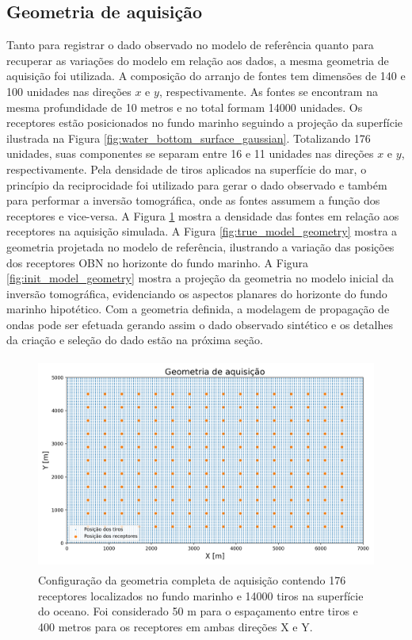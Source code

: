\subsection{Geometria de aquisição}

Tanto para registrar o dado observado no modelo de referência quanto para recuperar as variações do modelo em relação aos dados, a mesma geometria de aquisição foi utilizada. A composição do arranjo de fontes tem dimensões de 140 e 100 unidades nas direções $x$ e $y$, respectivamente. As fontes se encontram na mesma profundidade de 10 metros e no total formam 14000 unidades. Os receptores estão posicionados no fundo marinho seguindo a projeção da superfície ilustrada na Figura \ref{fig:water_bottom_surface_gaussian}. Totalizando 176 unidades, suas componentes se separam entre 16 e 11 unidades nas direções $x$ e $y$, respectivamente. Pela densidade de tiros aplicados na superfície do mar, o princípio da reciprocidade foi utilizado para gerar o dado observado e também para performar a inversão tomográfica, onde as fontes assumem a função dos receptores e vice-versa. A Figura \ref{fig:complete_geometry} mostra a densidade das fontes em relação aos receptores na aquisição simulada. A Figura \ref{fig:true_model_geometry} mostra a geometria projetada no modelo de referência, ilustrando a variação das posições dos receptores OBN no horizonte do fundo marinho. A Figura \ref{fig:init_model_geometry} mostra a projeção da geometria no modelo inicial da inversão tomográfica, evidenciando os aspectos planares do horizonte do fundo marinho hipotético. Com a geometria definida, a modelagem de propagação de ondas pode ser efetuada gerando assim o dado observado sintético e os detalhes da criação e seleção do dado estão na próxima seção. 
\begin{figure}[H]
	\centering
	\includegraphics[width=12cm,height=7cm]{Imgs/Metodologia/complete_geometry.png}
	\caption{Configuração da geometria completa de aquisição contendo 176 receptores localizados no fundo marinho e 14000 tiros na superfície do oceano. Foi considerado 50 m para o espaçamento entre tiros e 400 metros para os receptores em ambas direções X e Y.}
	\label{fig:complete_geometry}	
\end{figure}
